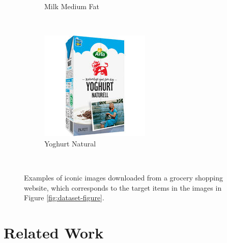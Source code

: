 \begin{figure}[t]
\begin{minipage}[b]{0.47\textwidth}
\begin{subfigure}[t]{0.32\textwidth}
			\caption{Milk Medium Fat}
			\label{subfig:clean-image-q}
		\end{subfigure}~
		\begin{subfigure}[t]{0.32\textwidth}
			\centering
			\includegraphics[width=\textwidth]{PaperA/clean-image-figure/Arla-Natural-Yoghurt_Clean.jpg}
			\caption{Yoghurt Natural}
			\label{subfig:clean-image-r}
		\end{subfigure}~ 
		\captionsetup{font=footnotesize}
		
		\caption{Examples of iconic images downloaded from a grocery shopping website, which corresponds to the target items in the images in Figure \ref{fig:dataset-figure}. \newline }
		\label{fig:clean-image-figure}
	\end{minipage} 
	\vspace{-2mm}
\end{figure}


\section{Related Work}\label{paperA:sec:related_work}


